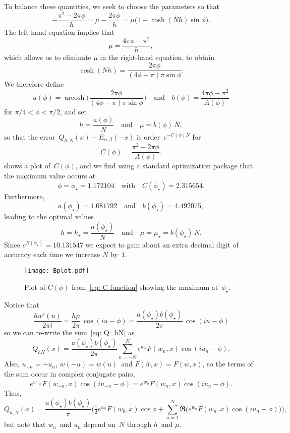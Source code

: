 \documentclass[12pt,a4paper]{article}
\newcommand{\arcosh}{\operatorname{arcosh}}
\begin{document}
To balance these quantities, we seek to choose the parameters so that
\cite[(4.2)]{WeidemanTrefethen2007}
\[
-\frac{\pi^2-2\pi\phi}{h}=\mu-\frac{2\pi\phi}{h}
    =\mu\bigl(1-\cosh(Nh)\sin\phi\bigr).
\]
The left-hand equation implies that
\[
\mu=\frac{4\pi\phi-\pi^2}{h},
\]
which allows us to eliminate $\mu$ in the right-hand equation, to obtain
\[
\cosh(Nh)=\frac{2\pi\phi}{(4\phi-\pi)\pi\sin\phi}.
\]
We therefore define
\[
a(\phi)=\arcosh\biggl(\frac{2\pi\phi}{(4\phi-\pi)\pi\sin\phi}\biggr)
\quad\text{and}\quad b(\phi)=\frac{4\pi\phi-\pi^2}{A(\phi)}
\]
for $\pi/4<\phi<\pi/2$, and set
\[
h=\frac{a(\phi)}{N}\quad\text{and}\quad \mu=b(\phi)\,N,
\]
so that the error~$Q_{h,N}(x)-E_{\alpha,\beta}(-x)$ is order~$e^{-C(\phi)N}$ 
for
\begin{equation}\label{eq: C function}
C(\phi)=\frac{\pi^2-2\pi\phi}{A(\phi)}.
\end{equation}
 shows a plot of~$C(\phi)$, and we find using a standard 
optimization package that the maximum value occurs at
\[
\phi=\phi_\star=1.172104\quad\text{with}\quad C(\phi_\star)=2.315654.
\]
Furthermore,
\[
a(\phi_\star)=1.081792\quad\text{and}\quad
b(\phi_\star)=4.492075,
\]
leading to the optimal values 
\[
h=h_\star=\frac{a(\phi_\star)}{N}\quad\text{and}\quad
\mu=\mu_\star=b(\phi_\star)\,N.
\]
Since $e^{B(\phi_\star)}=10.131547$ we expect to gain about an extra decimal
digit of accuracy each time we increase $N$ by~$1$.

\begin{figure}
\caption{Plot of $C(\phi)$ from~\eqref{eq: C function} showing the 
maximum at~$\phi_\star$.}\label{fig: C plot}
\begin{center}
\texttt{[image: Bplot.pdf]}
\end{center}
\end{figure}

Notice that
\[
\frac{hw'(u)}{2\pi i}=\frac{h\mu}{2\pi}\,\cos(iu-\phi)
    =\frac{a(\phi_\star)b(\phi_\star)}{2\pi}\,\cos(iu-\phi)
\]
so we can re-write the sum~\eqref{eq: Q_hN} as
\[
Q_{hN}(x)=\frac{a(\phi_\star)b(\phi_\star)}{2\pi}\sum_{n=-N}^N
    e^{w_n}F(w_n,x)\cos(iu_n-\phi).
\]
Also, $u_{-n}=-u_n$, $w(-u)=\overline{w(u)}$~and 
$F(\bar w,x)=\overline{F(w,x)}$, so the terms of the sum occur in complex 
conjugate pairs,
\[
e^{w_{-n}}F(w_{-n},x)\cos(iu_{-n}-\phi)
    =\overline{e^{w_n}F(w_n,x)\cos(iu_n-\phi)}.
\]
Thus,
\[
Q_{h,N}(x)=\frac{a(\phi_\star)b(\phi_\star)}{\pi}\biggl(
    \tfrac12e^{w_0}F(w_0,x)\cos\phi
    +\sum_{n=1}^N\Re\bigl(e^{w_n}F(w_n,x)\cos(iu_n-\phi)\bigr)\biggr),
\]
but note that $w_n$~and $u_n$ depend on~$N$ through $h$~and $\mu$.
\end{document}

